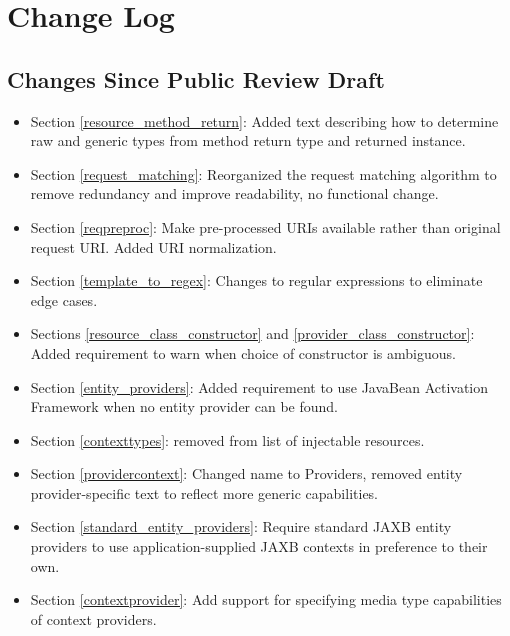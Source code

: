 \chapter{Change Log}

\section{Changes Since Public Review Draft}

\begin{itemize}
\item Section \ref{resource_method_return}: Added text describing how to determine raw and generic types from method return type and returned instance.
\item Section \ref{request_matching}: Reorganized the request matching algorithm to remove redundancy and improve readability, no functional change.
\item Section \ref{reqpreproc}: Make pre-processed URIs available rather than original request URI. Added URI normalization.
\item Section \ref{template_to_regex}: Changes to regular expressions to eliminate edge cases.
\item Sections \ref{resource_class_constructor} and \ref{provider_class_constructor}: Added requirement to warn when choice of constructor is ambiguous.
\item Section \ref{entity_providers}: Added requirement to use JavaBean Activation Framework when no entity provider can be found.
\item Section \ref{contexttypes}: removed  from list of injectable resources.
\item Section \ref{providercontext}: Changed name to Providers, removed entity provider-specific text to reflect more generic capabilities.
\item Section \ref{standard_entity_providers}: Require standard JAXB entity providers to use application-supplied JAXB contexts in preference to their own.
\item Section \ref{contextprovider}: Add support for specifying media type capabilities of context providers.
\end{itemize}
